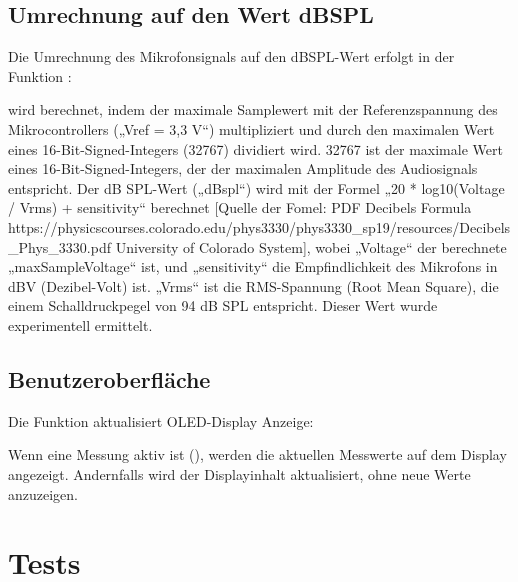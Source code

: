 \subsection{Umrechnung auf den Wert dBSPL}

Die Umrechnung des Mikrofonsignals auf den dBSPL-Wert erfolgt in der Funktion :

{
    \label{TestMicrophone:dBSPL}
}

 wird berechnet, indem der maximale Samplewert  mit der Referenzspannung des Mikrocontrollers („Vref = 3,3 V“) multipliziert und durch den maximalen Wert eines 16-Bit-Signed-Integers (32767) dividiert wird. 32767 ist der maximale Wert eines 16-Bit-Signed-Integers, der der maximalen Amplitude des Audiosignals entspricht.
Der dB SPL-Wert („dBspl“) wird mit der Formel „20 * log10(Voltage / Vrms) + sensitivity“ berechnet [Quelle der Fomel: PDF Decibels Formula https://physicscourses.colorado.edu/phys3330/phys3330\_sp19/resources/Decibels\_Phys\_3330.pdf University of Colorado System], wobei „Voltage“ der berechnete „maxSampleVoltage“ ist, und „sensitivity“ die Empfindlichkeit des Mikrofons in dBV (Dezibel-Volt) ist. „Vrms“ ist die RMS-Spannung (Root Mean Square), die einem Schalldruckpegel von 94 dB SPL entspricht. Dieser Wert wurde experimentell ermittelt.


\subsection{Benutzeroberfläche}
Die Funktion  aktualisiert OLED-Display Anzeige:


{
    \label{TestMicrophone:OLED}
}


Wenn eine Messung aktiv ist (), werden die aktuellen Messwerte auf dem Display angezeigt. Andernfalls wird der Displayinhalt aktualisiert, ohne neue Werte anzuzeigen.





\section{Tests}


